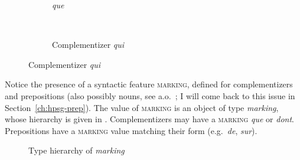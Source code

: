 \begin{figure}[h]
\caption{Lexical entries for the French complementizers \emph{que} and \emph{qui}}\label{avm:lexical-entry-que-qui}

\begin{subfigure}[b]{\linewidth}\centering
{}

\caption{\emph{que}}
\end{subfigure}\medskip\\
\begin{subfigure}[b]{\linewidth}\centering

          
\caption{Complementizer \emph{qui}}
\end{subfigure}
\end{figure}

Notice the presence of a syntactic feature \textsc{marking}, defined for complementizers and prepositions (also possibly nouns, see a.o.\ \citealt[159]{Sportiche.1998}; I will come back to this issue in Section~\ref{ch:hpsg-prep}). The value of \textsc{marking} is an object of type \emph{marking}, whose hierarchy is given in . Complementizers may have a \textsc{marking} \emph{que} or \emph{dont}. Prepositions have a \textsc{marking} value matching their form (e.g.\ \emph{de}, \emph{sur}). 

\begin{figure}[ht]
\centering
{}
    \caption{Type hierarchy of \emph{marking}}
    \label{fig:hrch-marking}
\end{figure}

